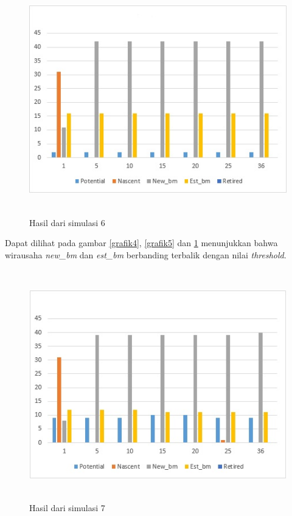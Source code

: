 	\begin{figure} [H]
	\centering  
	\includegraphics[width=12cm, height=10cm]{grafik6} 
		\caption[Hasil dari simulasi]{Hasil dari simulasi 6}
	\label{grafik6} 
\end{figure}

Dapat dilihat pada gambar \ref{grafik4}, \ref{grafik5} dan \ref{grafik6} menunjukkan bahwa wirausaha \textit{new\_bm} dan \textit{est\_bm} berbanding terbalik dengan nilai \textit{threshold}.

	\begin{figure} [H]
	\centering  
	\includegraphics[width=12cm, height=10cm]{grafik7} 
		\caption[Hasil dari simulasi]{Hasil dari simulasi 7}
	\label{grafik7} 
\end{figure}

